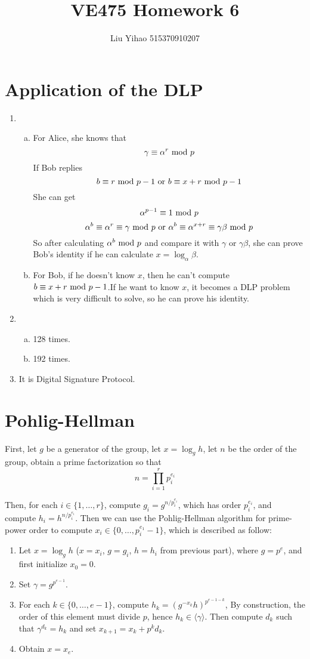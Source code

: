 \documentclass{article}
\title{VE475 Homework 6}
\author{Liu Yihao 515370910207}
\date{}
\renewcommand{\mod}{{\rm\ mod\ }}
\begin{document}
\maketitle

\section{Application of the DLP}
\begin{enumerate}
\item
\begin{enumerate}[(a)]
\item
For Alice, she knows that $$\gamma\equiv\alpha^r\mod p$$
If Bob replies $$b\equiv r\mod p-1{\rm\ or\ }b\equiv x+r\mod p-1$$
She can get $$\alpha^{p-1}\equiv 1\mod p$$
$$\alpha^b\equiv\alpha^r\equiv\gamma\mod p{\rm\ or\ }\alpha^b\equiv\alpha^{x+r}\equiv\gamma\beta\mod p$$
So after calculating $\alpha^b\mod p$ and compare it with $\gamma$ or $\gamma\beta$, she can prove Bob's identity if he can calculate $x=\log_\alpha\beta$.
\item 
For Bob, if he doesn't know $x$, then he can't compute $b\equiv x+r\mod p-1$.If he want to know $x$, it becomes a DLP problem which is very difficult to solve, so he can prove his identity.
\end{enumerate}
\item
\begin{enumerate}[(a)]
\item 128 times.
\item 192 times.
\end{enumerate}
\item
It is Digital Signature Protocol.
\end{enumerate}

\section{Pohlig-Hellman}
First, let $g$ be a generator of the group, let $x=\log_gh$, let $n$ be the order of the group, obtain a prime factorization so that $$n=\prod_{i=1}^rp_i^{e_i}$$

Then, for each $i\in\{1,\dots,r\}$, compute $g_i=g^{n/p_i^{e_i}}$, which has order $p_i^{e_i}$, and compute $h_i=h^{n/p_i^{e_i}}$. Then we can use the Pohlig-Hellman algorithm for prime-power order to compute $x_i\in\{0,\dots,p_i^{e_1}-1\}$, which is described as follow:
\begin{enumerate}
\item Let $x=\log_gh$ ($x=x_i$, $g=g_i$, $h=h_i$ from previous part), where $g=p^e$, and first initialize $x_0=0$.
\item Set $\gamma=g^{p^{e-1}}$.
\item For each $k\in\{0,\dots,e-1\}$, compute $h_k=(g^{-x_k}h)^{p^{e-1-k}}$, By construction, the order of this element must divide $p$, hence $h_k\in\langle\gamma\rangle$. Then compute $d_k$ such that $\gamma^{d_k}=h_k$ and set $x_{k+1}=x_k+p^kd_k$.
\item Obtain $x=x_e$.
\end{enumerate}
\end{document}

